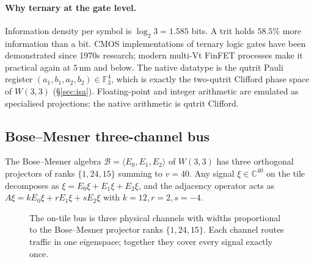 \documentclass[11pt,letterpaper]{article}
\theoremstyle{remark}
\newcommand{\W}{W(3,3)}
\newcommand{\FF}{\mathbb{F}}
\newcommand{\CC}{\mathbb{C}}
\newcommand{\BoseMesner}{\mathcal{B}}
\begin{document}
\paragraph{Why ternary at the gate level.}
Information density per symbol is $\log_2 3 = 1.585$ bits. A trit holds $58.5\%$ more
information than a bit. CMOS implementations of ternary logic gates have been
demonstrated since 1970s research; modern multi-Vt FinFET processes make it practical
again at $5$\,nm and below. The native datatype is the qutrit Pauli register
$(a_1, b_1, a_2, b_2) \in \FF_3^4$, which is exactly the two-qutrit Clifford phase space
of $\W$ (\S\ref{sec:isa}). Floating-point and integer arithmetic are emulated as
specialised projections; the native arithmetic is qutrit Clifford.

\subsection{Bose--Mesner three-channel bus}

The Bose--Mesner algebra $\BoseMesner = \langle E_0, E_1, E_2 \rangle$ of $\W$ has three
orthogonal projectors of ranks $\{1, 24, 15\}$ summing to $v = 40$. Any signal
$\xi \in \CC^{40}$ on the tile decomposes as $\xi = E_0\xi + E_1\xi + E_2\xi$, and the
adjacency operator acts as $A\xi = k E_0\xi + r E_1\xi + s E_2\xi$ with
$k = 12, r = 2, s = -4$.

\begin{figure}[ht]
\centering
{}
\caption{The on-tile bus is three physical channels with widths proportional to the
Bose--Mesner projector ranks $\{1, 24, 15\}$. Each channel routes traffic in one
eigenspace; together they cover every signal exactly once.}\label{fig:bus}
\end{figure}
\end{document}
